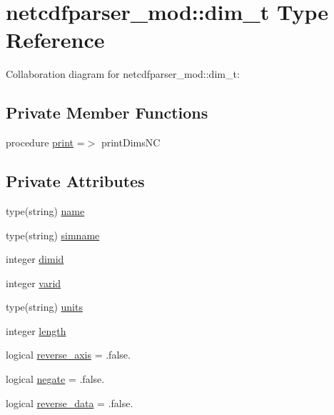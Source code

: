 \hypertarget{structnetcdfparser__mod_1_1dim__t}{}\section{netcdfparser\+\_\+mod\+:\+:dim\+\_\+t Type Reference}
\label{structnetcdfparser__mod_1_1dim__t}


Collaboration diagram for netcdfparser\+\_\+mod\+:\+:dim\+\_\+t\+:
\subsection*{Private Member Functions}
\begin{DoxyCompactItemize}
\item 
procedure \mbox{\hyperlink{structnetcdfparser__mod_1_1dim__t_aeb8d02051698385d0c46029a9a39c30f}{print}} =$>$ print\+Dims\+NC
\end{DoxyCompactItemize}
\subsection*{Private Attributes}
\begin{DoxyCompactItemize}
\item 
type(string) \mbox{\hyperlink{structnetcdfparser__mod_1_1dim__t_ac9200bc4639dedfbd0fe2345ec44d448}{name}}
\item 
type(string) \mbox{\hyperlink{structnetcdfparser__mod_1_1dim__t_a14ab4a777ae4e2429332ddc08f875601}{simname}}
\item 
integer \mbox{\hyperlink{structnetcdfparser__mod_1_1dim__t_ae0eee1b309e61daefc73868795c35cc9}{dimid}}
\item 
integer \mbox{\hyperlink{structnetcdfparser__mod_1_1dim__t_a850c5b53b1fa2c09e19ee37896065897}{varid}}
\item 
type(string) \mbox{\hyperlink{structnetcdfparser__mod_1_1dim__t_a42d4e5dd93905b5b6912dd7675d0e1db}{units}}
\item 
integer \mbox{\hyperlink{structnetcdfparser__mod_1_1dim__t_ad099f35ecc70f2370e69eddfa21235dd}{length}}
\item 
logical \mbox{\hyperlink{structnetcdfparser__mod_1_1dim__t_ae52ef90e32f69fb816c34eef2c25a9c5}{reverse\+\_\+axis}} = .false.
\item 
logical \mbox{\hyperlink{structnetcdfparser__mod_1_1dim__t_a3c5c37fcdaf204d8c51fe4fb0dc21e83}{negate}} = .false.
\item 
logical \mbox{\hyperlink{structnetcdfparser__mod_1_1dim__t_acf99009f46de2c7f946506d74977c2c5}{reverse\+\_\+data}} = .false.
\end{DoxyCompactItemize}


